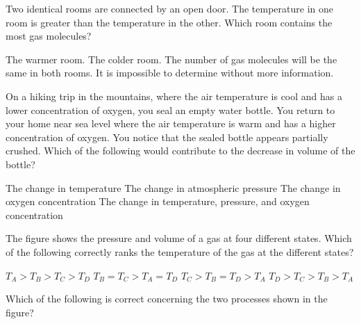 \documentclass{../../../oss-ap12ibhl-print}
\begin{document}
\begin{questions}
  \question Two identical rooms are connected by an open door. The temperature
  in one room is greater than the temperature in the other. Which room contains
  the most gas molecules?
  \begin{choices}
    \choice The warmer room.
    \choice The colder room.
    \choice The number of gas molecules will be the same in both rooms.
    \choice It is impossible to determine without more information.
  \end{choices}
    
  \question On a hiking trip in the mountains, where the air temperature is
  cool and has a lower concentration of oxygen, you seal an empty water bottle.
  You return to your home near sea level where the air temperature is warm and
  has a higher concentration of oxygen. You notice that the sealed bottle
  appears partially crushed. Which of the following would contribute to the
  decrease in volume of the bottle?
  \begin{choices}
    \choice The change in temperature
    \choice The change in atmospheric pressure
    \choice The change in oxygen concentration
    \choice The change in temperature, pressure, and oxygen concentration
  \end{choices}
    
  \question The figure shows the pressure and volume of a gas at four different
  states. Which of the following correctly ranks the temperature of the gas
  at the different states?

  \begin{minipage}{.3\textwidth}
  \end{minipage}
  \begin{minipage}{.6\textwidth}
    \begin{choices}
      \choice $T_A>T_B>T_C>T_D$
      \choice $T_B=T_C>T_A=T_D$
      \choice $T_C>T_B=T_D>T_A$
      \choice $T_D>T_C>T_B>T_A$
    \end{choices}
  \end{minipage}
  \newpage
  
  \question Which of the following is correct concerning the two processes shown
  in the figure?
  

\end{questions}
\end{document}
